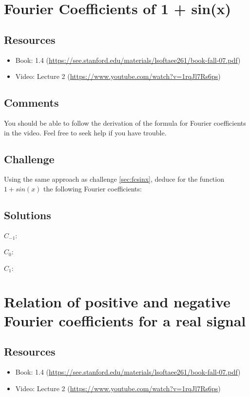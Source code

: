 \newpage

\section{Fourier Coefficients of 1 + sin(x)}
\label{sec:fcsinxp1}

\subsection*{Resources}
\begin{itemize}
    \item Book: 1.4 (\url{https://see.stanford.edu/materials/lsoftaee261/book-fall-07.pdf})
    \item Video: Lecture 2 (\url{https://www.youtube.com/watch?v=1rqJl7Rs6ps})
\end{itemize}

\subsection*{Comments}
You should be able to follow the derivation of the formula for Fourier coefficients in the video. Feel free to seek help if you have trouble.

\subsection*{Challenge}
Using the same approach as challenge \ref{sec:fcsinx}, deduce for the function $1+sin(x)$ the following Fourier coefficients:

\subsection*{Solutions}
$C_{-1}$: 

$C_0$: 

$C_1$: 

\timebox




\newpage

\section{Relation of positive and negative Fourier coefficients for a real signal}

\subsection*{Resources}
\begin{itemize}
    \item Book: 1.4 (\url{https://see.stanford.edu/materials/lsoftaee261/book-fall-07.pdf})
    \item Video: Lecture 2 (\url{https://www.youtube.com/watch?v=1rqJl7Rs6ps})
\end{itemize}

